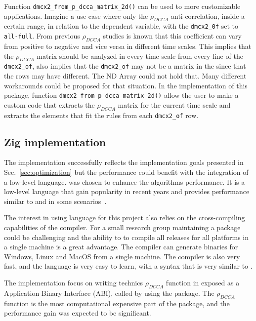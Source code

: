 \documentclass[nojss]{jss}
\begin{document}
Function \verb"dmcx2_from_p_dcca_matrix_2d()" can be used to more customizable applications. Imagine a use case where only the $\rho_{DCCA}$ anti-correlation, inside a certain range, in relation to the dependent variable, with the \verb"dmcx2_0f" set to \verb"all-full". From previous $\rho_{DCCA}$ studies is known that this coefficient can vary from positive to negative and vice  versa in different time scales. This implies that the $\rho_{DCCA}$ matrix should be analyzed in every time scale from every line of the \verb"dmcx2_of", also implies that the \verb"dmcx2_of" may not be a matrix in the since that the rows may have different. The  ND Array could not hold that. Many different workarounds could be proposed for that situation. In the implementation of this package, function \verb"dmcx2_from_p_dcca_matrix_2d()" allow the user to make a custom code that extracts the  $\rho_{DCCA}$ matrix for the current time scale and extracts the elements that fit the rules from each \verb"dmcx2_of" row.

\subsection{Zig implementation}

The  implementation successfully reflects the implementation goals presented in Sec.~\ref{sec:optimization} but the performance could benefit with the integration of a low-level language.  was chosen to enhance the algorithms performance. It is a low-level language that gain popularity in recent years and provides performance similar to  and  in some scenarios~\citep{10820804}.

The interest in using  language for this project also relies on the cross-compiling capabilities of the  compiler. For a small research group maintaining a package could be challenging and the ability to to compile all releases for all platforms in a single machine is a great advantage. The  compiler can generate binaries for Windows, Linux and MacOS from a single machine. The  compiler is also very fast, and the language is very easy to learn, with a syntax that is very similar to .

The implementation focus on writing technics $\rho_{DCCA}$ function in  exposed as a  Application Binary Interface (ABI), called by  using the  package. The $\rho_{DCCA}$ function is the most computational expensive part of the package, and the performance gain was expected to be significant.
\end{document}
